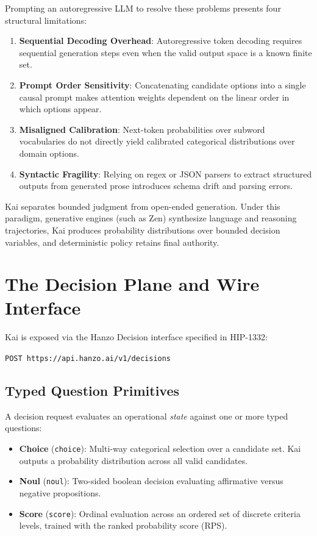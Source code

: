 \documentclass[11pt,a4paper]{article}
\begin{document}
Prompting an autoregressive LLM to resolve these problems presents four structural limitations:
\begin{enumerate}
    \item \textbf{Sequential Decoding Overhead}: Autoregressive token decoding requires sequential generation steps even when the valid output space is a known finite set.
    \item \textbf{Prompt Order Sensitivity}: Concatenating candidate options into a single causal prompt makes attention weights dependent on the linear order in which options appear.
    \item \textbf{Misaligned Calibration}: Next-token probabilities over subword vocabularies do not directly yield calibrated categorical distributions over domain options.
    \item \textbf{Syntactic Fragility}: Relying on regex or JSON parsers to extract structured outputs from generated prose introduces schema drift and parsing errors.
\end{enumerate}

Kai separates bounded judgment from open-ended generation. Under this paradigm, generative engines (such as Zen) synthesize language and reasoning trajectories, Kai produces probability distributions over bounded decision variables, and deterministic policy retains final authority.

\section{The Decision Plane and Wire Interface}

Kai is exposed via the Hanzo Decision interface specified in HIP-1332:
\begin{center}
\texttt{POST https://api.hanzo.ai/v1/decisions}
\end{center}

\subsection{Typed Question Primitives}

A decision request evaluates an operational \textit{state} against one or more typed questions:
\begin{itemize}
    \item \textbf{Choice} (\texttt{choice}): Multi-way categorical selection over a candidate set. Kai outputs a probability distribution across all valid candidates.
    \item \textbf{Noul} (\texttt{noul}): Two-sided boolean decision evaluating affirmative versus negative propositions.
    \item \textbf{Score} (\texttt{score}): Ordinal evaluation across an ordered set of discrete criteria levels, trained with the ranked probability score (RPS).
\end{itemize}
\end{document}
